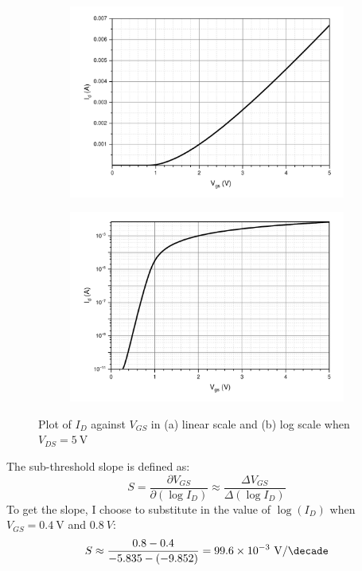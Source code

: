 \documentclass[12pt]{article}   %
\begin{document}
	\begin{figure}[htbp]
		\centering
		\begin{subfigure}{0.48\linewidth}
			\includegraphics[width=\linewidth]{Figures/E1_NMOS_Characteristic/Id_vgs_linear}
			\caption{}
			\label{fig:idVgsLinear}
		\end{subfigure}
		\begin{subfigure}{0.48\linewidth}
			\includegraphics[width=\linewidth]{Figures/E1_NMOS_Characteristic/Id_vgs_log}
			\caption{}
			\label{fig:idVgsLog}
		\end{subfigure}
		\caption{Plot of $I_{D}$ against $V_{GS}$ in (a) linear scale and (b) log scale when $V_{DS} = \SI{5}{\volt}$}
	\end{figure}
	
	The sub-threshold slope is defined as:
	\begin{equation}
		S = \frac{\partial V_{GS}}{\partial \left(\log I_D\right)} \approx \frac{\Delta V_{GS}}{\Delta \left(\log I_D\right)}
	\end{equation}
	To get the slope, I choose to substitute in the value of $\log(I_D)$ when $V_{GS} = \SI{0.4}{\volt}$ and $\SI{0.8}{V}$:
	\begin{equation}
		S \approx \frac{0.8 - 0.4}{-5.835 - \left(-9.852\right)} = 99.6 \times 10^{-3}\ \si{\volt\per\decade}
	\end{equation}
	
\end{document}
